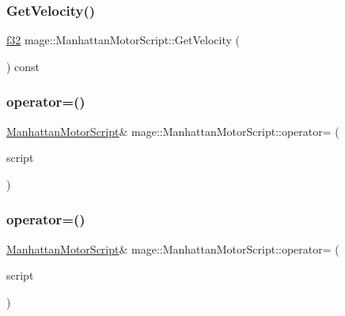 \subsubsection{\texorpdfstring{Get\+Velocity()}{GetVelocity()}}
{\footnotesize\ttfamily \hyperlink{namespacemage_a6a44ad388483959dc4dff9f2aef91431}{f32} mage\+::\+Manhattan\+Motor\+Script\+::\+Get\+Velocity (\begin{DoxyParamCaption}{ }\end{DoxyParamCaption}) const\hspace{0.3cm}{\ttfamily [noexcept]}}

\hypertarget{classmage_1_1_manhattan_motor_script_a563d4d429bbcabf25f57539857dde53c}{}\label{classmage_1_1_manhattan_motor_script_a563d4d429bbcabf25f57539857dde53c} 
\subsubsection{\texorpdfstring{operator=()}{operator=()}\hspace{0.1cm}{\footnotesize\ttfamily [1/2]}}
{\footnotesize\ttfamily \hyperlink{classmage_1_1_manhattan_motor_script}{Manhattan\+Motor\+Script}\& mage\+::\+Manhattan\+Motor\+Script\+::operator= (\begin{DoxyParamCaption}\item[{const \hyperlink{classmage_1_1_manhattan_motor_script}{Manhattan\+Motor\+Script} \&}]{script }\end{DoxyParamCaption})\hspace{0.3cm}{\ttfamily [delete]}}

\hypertarget{classmage_1_1_manhattan_motor_script_a944149dc06764bc23feffde4de100679}{}\label{classmage_1_1_manhattan_motor_script_a944149dc06764bc23feffde4de100679} 
\subsubsection{\texorpdfstring{operator=()}{operator=()}\hspace{0.1cm}{\footnotesize\ttfamily [2/2]}}
{\footnotesize\ttfamily \hyperlink{classmage_1_1_manhattan_motor_script}{Manhattan\+Motor\+Script}\& mage\+::\+Manhattan\+Motor\+Script\+::operator= (\begin{DoxyParamCaption}\item[{\hyperlink{classmage_1_1_manhattan_motor_script}{Manhattan\+Motor\+Script} \&\&}]{script }\end{DoxyParamCaption})\hspace{0.3cm}{\ttfamily [delete]}}

